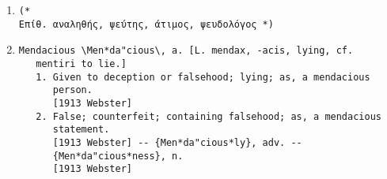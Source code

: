 \documentclass{article}
\begin{document}
\begin{itemize}
\begin{enumerate}
\item{
\begin{lstlisting}
(* 
Επίθ. αναληθής, ψεύτης, άτιμος, ψευδολόγος *)
\end{lstlisting}}
\item{
\begin{lstlisting}
Mendacious \Men*da"cious\, a. [L. mendax, -acis, lying, cf.
   mentiri to lie.]
   1. Given to deception or falsehood; lying; as, a mendacious
      person.
      [1913 Webster]
   2. False; counterfeit; containing falsehood; as, a mendacious
      statement.
      [1913 Webster] -- {Men*da"cious*ly}, adv. --
      {Men*da"cious*ness}, n.
      [1913 Webster]
\end{lstlisting}}
\end{enumerate}


\end{itemize}
\end{document}
